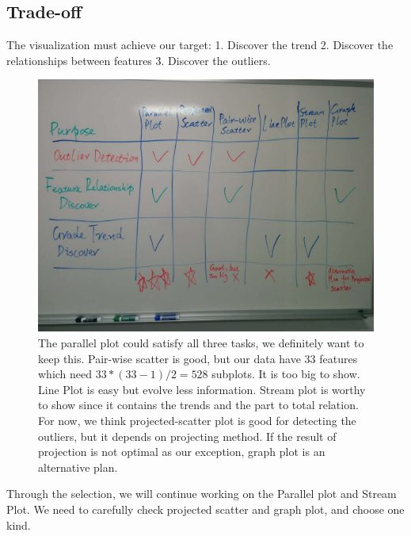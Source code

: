 \documentclass{article}
\begin{document}
\subsection{Trade-off}
The visualization must achieve our target: 1. Discover the trend 2. Discover the relationships between features 3. Discover the outliers.
\begin{figure}[H]
\centering
\includegraphics[scale=0.3]{compare.jpg}
\caption{The parallel plot could satisfy all three tasks, we definitely want to keep this. Pair-wise scatter is good, but our data have 33 features which need $33*(33-1)/2 = 528$ subplots. It is too big to show. Line Plot is easy but evolve less information. Stream plot is worthy to show since it contains the trends and the part to total relation. For now, we think projected-scatter plot is good for detecting the outliers, but it depends on projecting method. If the result of projection is not optimal as our exception, graph plot is an alternative plan.}
\end{figure}
Through the selection, we will continue working on the Parallel plot and Stream Plot. We need to carefully check projected scatter and graph plot, and choose one kind.
\end{document}
